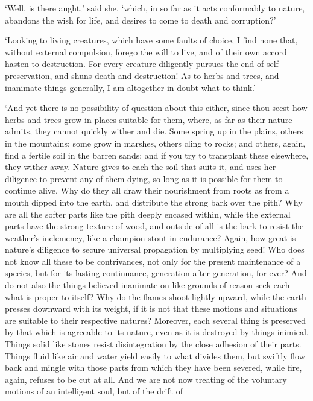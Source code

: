 \documentclass[12pt]{book}
\begin{document}
`Well, is there aught,' said she, `which, in so far as it acts
conformably to nature, abandons the wish for life, and desires to come
to death and corruption?'

`Looking to living creatures, which have some faults of choice, I find
none that, without external compulsion, forego the will to live, and of
their own accord hasten to destruction. For every creature diligently
pursues the end of self-preservation, and shuns death and destruction!
As to herbs and trees, and inanimate things generally, I am altogether
in doubt what to think.'

`And yet there is no possibility of question about this either, since
thou seest how herbs and trees grow in places suitable for them, where,
as far as their nature admits, they cannot quickly wither and die. Some
spring up in the plains, others in the mountains; some grow in marshes,
others cling to rocks; and others, again, find a fertile soil in the
barren sands; and if you try to transplant these elsewhere, they wither
away. Nature gives to each the soil that suits it, and uses her
diligence to prevent any of them dying, so long as it is possible for
them to continue alive. Why do they all draw their nourishment from
roots as from a mouth dipped into the earth, and distribute the strong
bark over the pith? Why are all the softer parts like the pith deeply
encased within, while the external parts have the strong texture of
wood, and outside of all is the bark to resist the weather's
inclemency, like a champion stout in endurance? Again, how great is
nature's diligence to secure universal propagation by multiplying seed!
Who does not know all these to be contrivances, not only for the present
maintenance of a species, but for its lasting continuance, generation
after generation, for ever? And do not also the things believed
inanimate on like grounds of reason seek each what is proper to itself?
Why do the flames shoot lightly upward, while the earth presses downward
with its weight, if it is not that these motions and situations are
suitable to their respective natures? Moreover, each several thing is
preserved by that which is agreeable to its nature, even as it is
destroyed by things inimical. Things solid like stones resist
disintegration by the close adhesion of their parts. Things fluid like
air and water yield easily to what divides them, but swiftly flow back
and mingle with those parts from which they have been severed, while
fire, again, refuses to be cut at all. And we are not now treating of
the voluntary motions of an intelligent soul, but of the drift of
\end{document}
